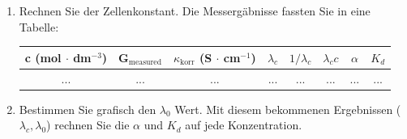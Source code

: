 \begin{enumerate}
\item Rechnen Sie der Zellenkonstant.
Die Messergäbnisse fassten Sie in eine Tabelle:

\begin{table}[!h]
\centering
\begin{tabular}{|c|c|c|c|c|c|c|c|}
\hline
c (mol $\cdot$ dm$^{-3}$) & G$_{\text{measured}}$ & $\kappa_{\text{korr}}$ (S $\cdot$ cm$^{-1}$) & $\lambda_c$ & $1/\lambda_c$ & $\lambda_c c$ & $\alpha$ & $K_d$ \\
\hline
... & ... & ... & ... & ... & ... & ... & ... \\
\end{tabular}
\label{table:vez}
\end{table}

\item Bestimmen Sie grafisch den $\lambda_0$ Wert. Mit diesem bekommenen Ergebnissen ($\lambda_c, \lambda_0$) rechnen Sie die $\alpha$ und $K_d$ auf jede Konzentration. 

\end{enumerate}


